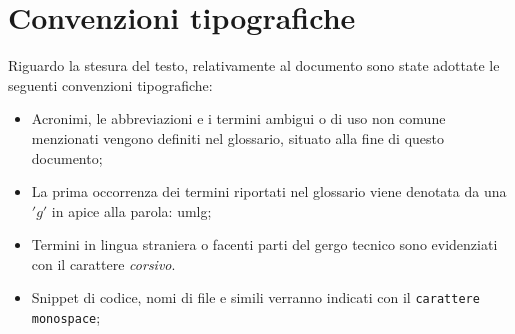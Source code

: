 \section{Convenzioni tipografiche}
Riguardo la stesura del testo, relativamente al documento sono state adottate le seguenti convenzioni tipografiche:
\begin{itemize}
	\item Acronimi, le abbreviazioni e i termini ambigui o di uso non comune menzionati vengono
        definiti nel glossario, situato alla fine di questo documento;
    \item La prima occorrenza dei termini riportati nel glossario viene denotata da una $'g'$ in
        apice alla parola: \gls{umlg};
	\item Termini in lingua straniera o facenti parti del gergo tecnico sono evidenziati con il
        carattere \emph{corsivo}.
	\item  Snippet di codice, nomi di file e simili verranno indicati con il \texttt{carattere monospace};
\end{itemize}